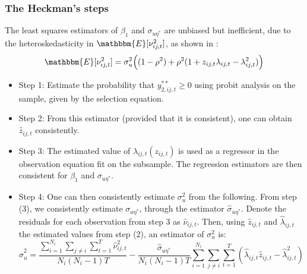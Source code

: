 \begin{frame}[label = Heckman]
    \frametitle{The Heckman's steps}
    The least squares estimators of $\beta_1$ and $\sigma_{u\eta^*}$ are unbiased but inefficient, due to the heteroskedasticity in $\mathbbm{E}[\nu_{ij,t}^2]$, as shown in \cite{heckman1979sample}:
\begin{align*}
    \mathbbm{E}[\nu_{ij,t}^2] = \sigma_u^2 \Big((1-\rho^2) + \rho^2(1+ z_{ij,t} \lambda_{ij,t} - \lambda_{ij,t}^2)\Big)
\end{align*}

\begin{itemize}
    \item Step 1: Estimate the probability that $y^{**}_{2,ij,t} \geq 0$ using probit analysis on the sample, given by the selection equation.
    \item Step 2: From this estimator (provided that it is consistent), one can obtain $\hat{z}_{ij,t}$ consistently.
    \item Step 3: The estimated value of $\lambda_{ij,t}(z_{ij,t})$ is used as a regressor in the observation equation fit on the subsample. The regression estimators are then consistent for $\beta_1$ and $\sigma_{u\eta^*}$.
    \item Step 4: One can then consistently estimate $\sigma_u^2$ from the following. From step (3), we consistently estimate $\sigma_{u\eta^*}$, through the estimator $\hat{\sigma}_{u\eta^*}$. Denote the residuals for each observation from step 3 as $\hat{\nu}_{ij,t}$. Then, using $\hat{z}_{ij,t}$ and $\hat{\lambda}_{ij,t}$ the estimated values from step (2), an estimator of  $\sigma_u^2$ is:
    $$\hat{\sigma}_u^2 = \frac{\sum_{i=1}^{N_i}\sum_{j\neq i}\sum_{t=1}^T \hat{\nu}_{ij,t}^2}{N_i(N_i-1)T} - \frac{\hat{\sigma}_{u\eta^*}}{N_i(N_i-1)T}  \sum_{i=1}^{N_i}\sum_{j\neq i}\sum_{t=1}^T (\hat{\lambda}_{ij,t} \hat{z}_{ij,t} - \hat{\lambda}_{ij,t}^2)$$
\end{itemize}

\end{frame}